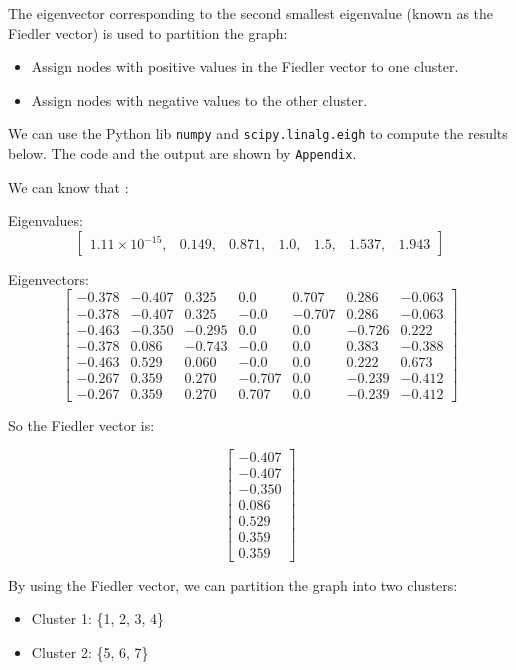 \documentclass[12pt]{article}
\begin{document}
The eigenvector corresponding to the second smallest eigenvalue (known as the Fiedler vector) is used to partition the graph:
\begin{itemize}
    \item Assign nodes with positive values in the Fiedler vector to one cluster.
    \item Assign nodes with negative values to the other cluster.
\end{itemize}

We can use the Python lib \texttt{numpy} and \texttt{scipy.linalg.eigh} to compute the results below.
The code and the output are shown by \texttt{Appendix}.

We can know that :

Eigenvalues:
\[
\begin{bmatrix}
1.11 \times 10^{-15}, & 0.149, & 0.871, & 1.0, & 1.5, & 1.537, & 1.943
\end{bmatrix}
\]

Eigenvectors:
\[
\begin{bmatrix}
-0.378 & -0.407 &  0.325 &  0.0   &  0.707 &  0.286 & -0.063 \\
-0.378 & -0.407 &  0.325 & -0.0   & -0.707 &  0.286 & -0.063 \\
-0.463 & -0.350 & -0.295 &  0.0   &  0.0   & -0.726 &  0.222 \\
-0.378 &  0.086 & -0.743 & -0.0   &  0.0   &  0.383 & -0.388 \\
-0.463 &  0.529 &  0.060 & -0.0   &  0.0   &  0.222 &  0.673 \\
-0.267 &  0.359 &  0.270 & -0.707 &  0.0   & -0.239 & -0.412 \\
-0.267 &  0.359 &  0.270 &  0.707 &  0.0   & -0.239 & -0.412
\end{bmatrix}
\]

So the Fiedler vector is:

\[
\begin{bmatrix}
-0.407 \\ -0.407 \\ -0.350 \\ 0.086 \\ 0.529 \\ 0.359 \\ 0.359
\end{bmatrix}
\]

By using the Fiedler vector, we can partition the graph into two clusters:
\begin{itemize}
    \item Cluster 1: \{1, 2, 3, 4\}
    \item Cluster 2: \{5, 6, 7\}
\end{itemize}
\end{document}
